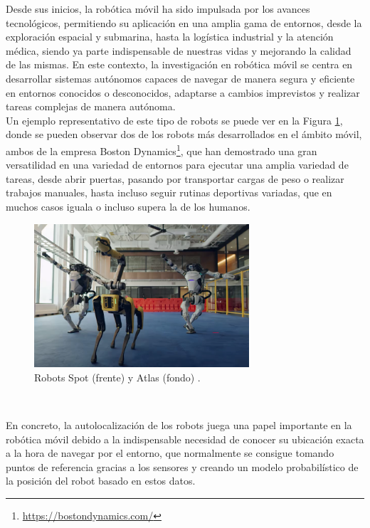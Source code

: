 Desde sus inicios, la robótica móvil ha sido impulsada por los avances
tecnológicos, permitiendo su aplicación en una amplia gama de entornos, desde la
exploración espacial y submarina, hasta la logística industrial y la atención
médica, siendo ya parte indispensable de nuestras vidas y mejorando la calidad
de las mismas.
En este contexto, la investigación en robótica móvil se centra en desarrollar
sistemas autónomos capaces de navegar de manera segura y eficiente en entornos
conocidos o desconocidos, adaptarse a cambios imprevistos y realizar tareas
complejas de manera autónoma.
\\

Un ejemplo representativo de este tipo de robots se puede ver en la Figura
\ref{fig:boston_dynamics}, donde se pueden observar dos de los robots más
desarrollados en el ámbito móvil, ambos de la empresa Boston Dynamics\footnote{
\href{https://bostondynamics.com/}{https://bostondynamics.com/}}, que han
demostrado una gran versatilidad en una variedad de entornos para ejecutar una
amplia variedad de tareas, desde abrir puertas, pasando por transportar cargas
de peso o realizar trabajos manuales, hasta incluso seguir rutinas deportivas
variadas, que en muchos casos iguala o incluso supera la de los humanos.

\begin{figure} [h!]
  \begin{center}
    \includegraphics[width=8cm]{figs/atlas_spot_robots}
  \end{center}
  \caption{Robots Spot (frente) y Atlas (fondo) \cite{atlas_spot}.}
  \label{fig:boston_dynamics}
\end{figure}\

En concreto, la autolocalización de los robots juega una papel importante en la
robótica móvil debido a la indispensable necesidad de conocer su ubicación
exacta a la hora de navegar por el entorno, que normalmente se consigue tomando
puntos de referencia gracias a los sensores y creando un modelo probabilístico
de la posición del robot basado en estos datos.
\\

